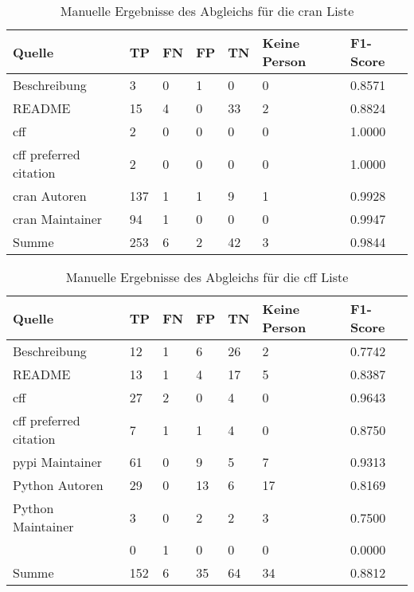 \begin{table}[H]
    \centering
    \begin{tabularx}{\textwidth}{XR{.5cm}R{.5cm}R{.5cm}R{.5cm}R{2.8cm}R{2cm}}
        \toprule
        \textbf{Quelle} & \textbf{TP} & \textbf{FN} & \textbf{FP} & \textbf{TN} & \textbf{Keine Person} & \textbf{F1-Score} \\ \midrule
        Beschreibung                 & 3   & 0 & 1 & 0  & 0 & 0.8571 \\
        README                       & 15  & 4 & 0 & 33 & 2 & 0.8824 \\
        \gls{cff}                    & 2   & 0 & 0 & 0  & 0 & 1.0000 \\
        \gls{cff} preferred citation & 2   & 0 & 0 & 0  & 0 & 1.0000 \\
        \gls{cran} Autoren           & 137 & 1 & 1 & 9  & 1 & 0.9928 \\
        \gls{cran} Maintainer        & 94  & 1 & 0 & 0  & 0 & 0.9947 \\ \midrule
        Summe                        & 253 & 6 & 2 & 42 & 3 & 0.9844 \\
        \bottomrule
    \end{tabularx}
    \caption{Manuelle Ergebnisse des Abgleichs für die \gls{cran} Liste}
    \label{tab:cran_matching_results_manual_anhang}
\end{table}

\begin{table}[H]
    \centering
    \begin{tabularx}{\textwidth}{XR{.5cm}R{.5cm}R{.5cm}R{.5cm}R{2.8cm}R{2cm}}
        \toprule
        \textbf{Quelle} & \textbf{TP} & \textbf{FN} & \textbf{FP} & \textbf{TN} & \textbf{Keine Person} & \textbf{F1-Score} \\ \midrule
        Beschreibung                 & 12 & 1  & 6  & 26 & 2  & 0.7742 \\
        README                       & 13 & 1  & 4  & 17 & 5  & 0.8387 \\
        \gls{cff}                    & 27 & 2  & 0  & 4  & 0  & 0.9643\\
        \gls{cff} preferred citation & 7  & 1  & 1  & 4  & 0  & 0.8750 \\
        \gls{pypi} Maintainer        & 61 & 0  & 9  & 5  & 7  & 0.9313 \\
        Python Autoren               & 29 & 0  & 13 & 6  & 17 & 0.8169 \\
        Python Maintainer            & 3  & 0  & 2  & 2  & 3  & 0.7500 \\
                      & 0  & 1  & 0  & 0  & 0  & 0.0000 \\ \midrule
        Summe                        & 152 & 6 & 35 & 64 & 34 & 0.8812 \\
        \bottomrule
    \end{tabularx}
    \caption{Manuelle Ergebnisse des Abgleichs für die \gls{cff} Liste}
    \label{tab:cff_matching_results_manual_anhang}
\end{table}

